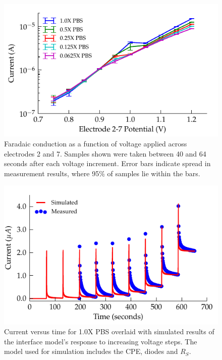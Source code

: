 \documentclass[journal, a4paper]{IEEEtran}
\begin{document}
\begin{figure}
    \begin{center}
        \includegraphics{graphics/currentVoltage_logY_IEEE}
    \end{center}
    \caption{Faradaic conduction as a function of voltage applied across electrodes 2 and 7. Samples shown were taken between 40 and 64 seconds after each voltage increment. Error bars indicate spread in measurement results, where 95\% of samples lie within the bars.}
    \label{fig:faradaic_logCurrentVsVoltage}
\end{figure}

\begin{figure}
    \begin{center}
        \includegraphics{graphics/faradaic_currentVsTimeIEEE}
    \end{center}
    \caption{Current versus time for 1.0X PBS overlaid with simulated results of the interface model's response to increasing voltage steps. The model used for simulation includes the CPE, diodes and $R_{S}$.}
    \label{fig:faradaic_currentVsTime}
\end{figure}
\end{document}
